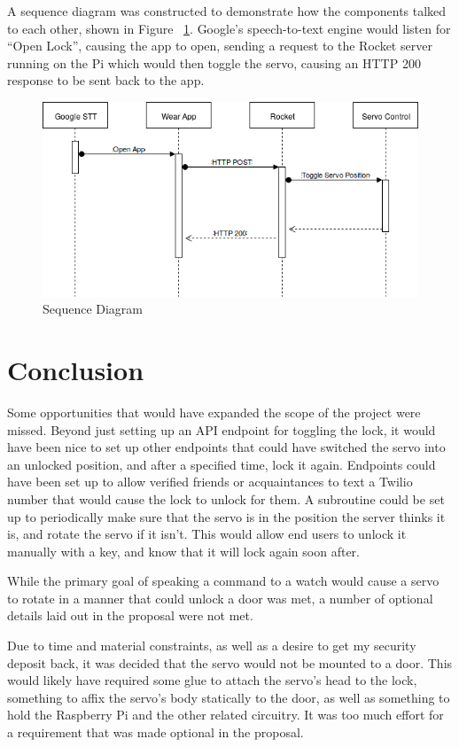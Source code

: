 \documentclass[a4paper]{article}
\begin{document}
A sequence diagram was constructed to demonstrate how the components talked to each other, shown in Figure ~\ref{fig:sequence}.
Google's speech-to-text engine would listen for ``Open Lock'', causing the app to open, sending a request to the Rocket server running on the Pi which would then toggle the servo, causing an HTTP 200 response to be sent back to the app.
\begin{figure}[H]
    \center
    \label{fig:sequence}
    \caption{Sequence Diagram}
    \includegraphics[width=14cm]{SesameSequenceDiagram.png}
\end{figure}
\section{Conclusion}\label{sec:conclusion}

Some opportunities that would have expanded the scope of the project were missed.
Beyond just setting up an API endpoint for toggling the lock, it would have been nice to set up other endpoints that could have switched the servo into an unlocked position, and after a specified time, lock it again.
Endpoints could have been set up to allow verified friends or acquaintances to text a Twilio number that would cause the lock to unlock for them.
A subroutine could be set up to periodically make sure that the servo is in the position the server thinks it is, and rotate the servo if it isn't.
This would allow end users to unlock it manually with a key, and know that it will lock again soon after.


While the primary goal of speaking a command to a watch would cause a servo to rotate in a manner that could unlock a door was met, a number of optional details laid out in the proposal were not met.

Due to time and material constraints, as well as a desire to get my security deposit back, it was decided that the servo would not be mounted to a door.
This would likely have required some glue to attach the servo's head to the lock, something to affix the servo's body statically to the door, as well as something to hold the Raspberry Pi and the other related circuitry.
It was too much effort for a requirement that was made optional in the proposal.
\end{document}
